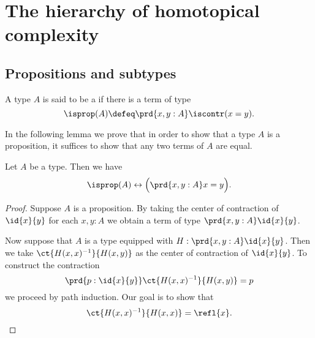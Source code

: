 \chapter{The hierarchy of homotopical complexity}


\section{Propositions and subtypes}

\begin{defn}
A type $A$ is said to be a  if there is a term of type
\begin{equation*}
\isprop(A)\defeq\prd{x,y:A}\iscontr(x=y).
\end{equation*}
\end{defn}

In the following lemma we prove that in order to show that a type $A$ is a proposition, it suffices to show that any two terms of $A$ are equal.

\begin{lem}\label{lem:isprop_eq}
Let $A$ be a type. Then we have
\begin{equation*}
\isprop(A)\leftrightarrow \Big(\prd{x,y:A}x=y\Big).
\end{equation*}
\end{lem}

\begin{proof}
Suppose $A$ is a proposition. By taking the center of contraction of $\id{x}{y}$ for each $x,y:A$ we obtain a term of type $\prd{x,y:A}\id{x}{y}$.

Now suppose that $A$ is a type equipped with $H:\prd{x,y:A}\id{x}{y}$. Then we take $\ct{H(x,x)^{-1}}{H(x,y)}$ as the center of contraction of $\id{x}{y}$. To construct the contraction
\begin{equation*}
\prd{p:\id{x}{y}} \ct{H(x,x)^{-1}}{H(x,y)}=p
\end{equation*}
we proceed by path induction. Our goal is to show that
\begin{equation*}
\ct{H(x,x)^{-1}}{H(x,x)}=\refl{x}.\qedhere
\end{equation*}
\end{proof}

